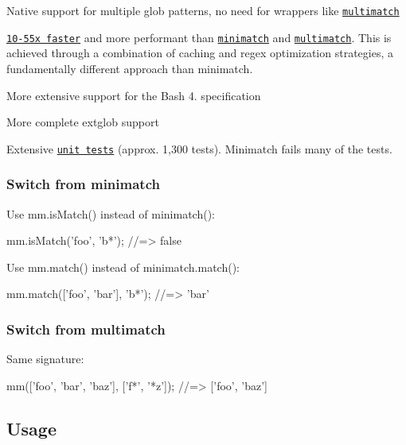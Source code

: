 \begin{DoxyItemize}
\item Native support for multiple glob patterns, no need for wrappers like \href{https://github.com/sindresorhus/multimatch}{\tt multimatch}
\item \href{#benchmarks}{\tt 10-\/55x faster} and more performant than \href{https://github.com/isaacs/minimatch}{\tt minimatch} and \href{https://github.com/sindresorhus/multimatch}{\tt multimatch}. This is achieved through a combination of caching and regex optimization strategies, a fundamentally different approach than minimatch.
\item More extensive support for the Bash 4. specification
\item More complete extglob support
\item Extensive \href{./test}{\tt unit tests} (approx. 1,300 tests). Minimatch fails many of the tests.
\end{DoxyItemize}

\subsubsection*{Switch from minimatch}

Use {\ttfamily mm.\+is\+Match()} instead of {\ttfamily minimatch()}\+:


\begin{DoxyCode}
mm.isMatch('foo', 'b*');
//=> false
\end{DoxyCode}


Use {\ttfamily mm.\+match()} instead of {\ttfamily minimatch.\+match()}\+:


\begin{DoxyCode}
mm.match(['foo', 'bar'], 'b*');
//=> 'bar'
\end{DoxyCode}


\subsubsection*{Switch from multimatch}

Same signature\+:


\begin{DoxyCode}
mm(['foo', 'bar', 'baz'], ['f*', '*z']);
//=> ['foo', 'baz']
\end{DoxyCode}






\subsection*{Usage}

